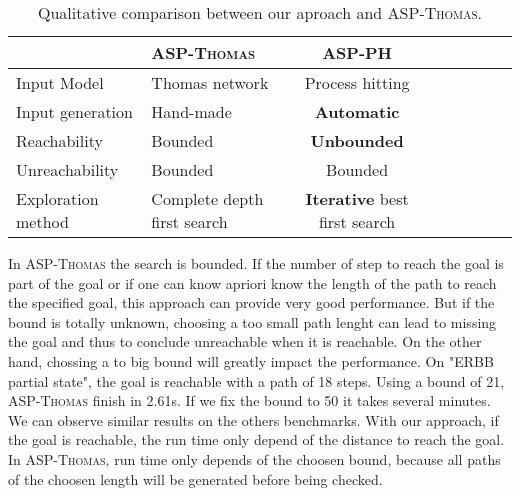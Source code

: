 \begin{table*}[ht]
\begin{center}
\noindent%
\begin{tabular}{|l|l|c||c|c|c|c|c|}
\hline
  & \textsc{ASP-Thomas} & \textsc{ASP-PH} \\
\hline
\hline
 Input Model & Thomas network & Process hitting \\
\hline
 Input generation & Hand-made & {\bf Automatic} \\ %
\hline
 Reachability & Bounded & {\bf Unbounded} \\
\hline
 Unreachability & Bounded & Bounded \\
\hline
 Exploration method & Complete depth first search & {\bf Iterative} best first search \\
\hline
\end{tabular}
\vspace*{4pt}
\caption{\label{tab:qualitative_differences}
Qualitative comparison between our aproach and \textsc{ASP-Thomas}.
}
\end{center}
\end{table*}


	In \textsc{ASP-Thomas} the search is bounded.
	If the number of step to reach the goal is part of the goal or if one can know apriori know the length of the path to reach the specified goal,
	this approach can provide very good performance.
	But if the bound is totally unknown, choosing a too small path lenght can lead to missing the goal and thus to conclude unreachable when it is reachable.
	On the other hand, chossing a to big bound will greatly impact the performance.
	On "ERBB partial state", the goal is reachable with a path of 18 steps.
	Using a bound of 21, \textsc{ASP-Thomas} finish in 2.61s.
	If we fix the bound to 50 it takes several minutes.
	We can observe similar results on the others benchmarks.
	With our approach, if the goal is reachable, the run time only depend of the distance to reach the goal.
	In \textsc{ASP-Thomas}, run time only depends of the choosen bound, because all paths of the choosen length will be generated before being checked.

